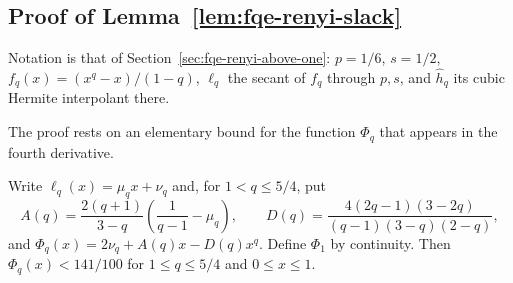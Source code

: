 \subsection{Proof of Lemma~\ref{lem:fqe-renyi-slack}}\label{sec:sup-renyi-slack}
Notation is that of Section~\ref{sec:fqe-renyi-above-one}: $p=1/6$, $s=1/2$,
$f_q(x)=(x^q-x)/(1-q)$, $\ell_q$ the secant of $f_q$ through $p,s$, and $\widehat h_q$ its cubic Hermite
interpolant there.


The proof rests on an elementary bound for the function $\Phi_q$ that appears in the fourth derivative.

\begin{lemma}
\label{lem:fqe-slack-fourth-derivative}
Write $\ell_q(x)=\mu_qx+\nu_q$ and, for $1<q\le5/4$, put
\[
 A(q)=\frac{2(q+1)}{3-q}\left(\frac1{q-1}-\mu_q\right),\qquad
 D(q)=\frac{4(2q-1)(3-2q)}{(q-1)(3-q)(2-q)},
\]
and $\Phi_q(x)=2\nu_q+A(q)x-D(q)x^q$.
Define $\Phi_1$ by continuity. Then $\Phi_q(x)<141/100$ for
$1\le q\le5/4$ and $0\le x\le1$.
\end{lemma}
